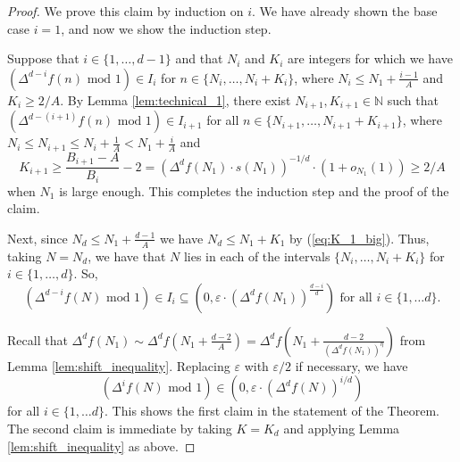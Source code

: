 \documentclass[10pt,a4paper]{amsart}
\newcommand{\N}{\mathbb{N}}
\renewcommand{\epsilon}{\varepsilon}
\renewcommand{\geq}{\geqslant}
\renewcommand{\leq}{\leqslant}
\renewcommand{\subset}{\subseteq}
\begin{document}
\begin{proof}
We prove this claim by induction on $i$. We have already shown the base case $i=1$, and now we show the induction step.

Suppose that $i\in\{1,\dots, d-1\}$ and that $N_i$ and $K_i$ are integers for which we have $(\Delta^{d-i}f(n) \text{ mod } 1) \in I_{i}$ for $n\in \{N_i,\dots, N_i+K_i\}$, where $N_i\leq N_{1}+\frac{i-1}{A}$ and $K_i\geq 2/A$. By Lemma \ref{lem:technical_1}, there exist $N_{i+1},K_{i+1}\in \N$ such that $(\Delta^{d-(i+1)}f(n) \text{ mod } 1) \in I_{i+1}$ for all $n\in\{N_{i+1},\dots, N_{i+1}+K_{i+1}\}$, where $N_i\leq N_{i+1}\leq N_{i}+\frac{1}{A}< N_{1}+\frac{i}{A}$ and 
\begin{equation}\label{eq:length_of_interval}
K_{i+1}\geq \frac{ B_{i+1}-A}{B_i}-2 =  \left(\Delta^{d}f(N_1)\cdot s(N_1)\right)^{-1/d} \cdot (1+o_{N_1}(1))\geq 2/A
\end{equation}
when $N_1$ is large enough. This completes the induction step and the proof of the claim. 


Next, since $N_{d}\leq N_1+\frac{d-1}{A}$ we have $N_{d}\leq N_1+K_1$ by (\ref{eq:K_1_big}). Thus, taking $N=N_{d}$, we have that $N$ lies in each of the intervals $\{N_i,\dots, N_i+K_i\}$ for $i\in \{1,\dots, d\}$. So,
\[
(\Delta^{d-i}f(N)\text{ mod } 1)\in I_i\subset(0,\epsilon\cdot (\Delta^{d}f(N_1))^{\frac{d-i}{d}}) \text{ for all }i\in\{1,\dots d\}.
\]

Recall that $\Delta^{d}f(N_1)\sim  \Delta^{d}f\left( N_1+\frac{d-2}{A}\right)=\Delta^{d}f\left( N_1+\frac{d-2}{(\Delta^{d}f(N_1))^{\eta}}\right)$ from Lemma \ref{lem:shift_inequality}. Replacing $\epsilon$ with $\epsilon/2$ if necessary, we have
\[
(\Delta^{i}f(N)\text{ mod } 1)\in (0,\epsilon\cdot (\Delta^{d}f(N))^{i/d})
\]
for all $i\in\{1,\dots d\}$. This shows the first claim in the statement of the Theorem. The second claim is immediate by taking $K = K_{d}$ and applying  Lemma \ref{lem:shift_inequality} as above.
\end{proof}
\end{document}
